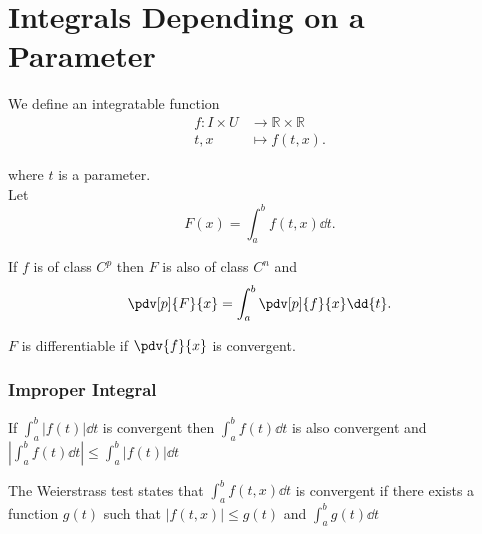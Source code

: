 \part{Integrals Depending on a Parameter}

We define an integratable function
\begin{align*}
	f: I\times U & \longrightarrow \mathbb{R}\times \mathbb{R} \\
	t,x          & \longmapsto f(t,x)
	.\end{align*}

where $t$ is a parameter.\\
Let
\[
	F(x) = \int_a^b f(t,x) \dd{t}
	.\]

\begin{theorem}
	If $f$ is of class $C^p$ then $F$ is also of class $C^n$ and
	\[
		\pdv[p]{F}{x} =\int_a^b \pdv[p]{f}{x} \dd{t}
		.\]
\end{theorem}

\begin{remark}
    $F$ is differentiable if $\pdv{f}{x} $ is convergent.
\end{remark}
\section{Improper Integral}

\begin{theorem}
    If $\int_a^b |f(t)|\dd{t}$ is convergent then $\int_a^b f(t)\dd {t}$ is also convergent and $\left| \int_a^b f(t) \dd{t} \right| \le \int_a^b |f(t)| \dd{t}$
\end{theorem}

\begin{theorem}
    The Weierstrass test states that $\int_a^b f(t,x)\dd{t} $ is convergent if there exists a function $g(t)$ such that $|f(t,x)|\le g(t)$ and $\int_a^b g(t)\dd{t}$
\end{theorem}

